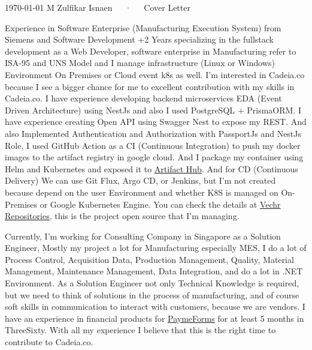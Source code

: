 \documentclass[10pt, a4paper]{awesome-cv}
\begin{document}
\makecvheader[R]

\makecvfooter
  {\today}
  {M Zulfikar Isnaen~~~·~~~Cover Letter}
  {}

\makelettertitle

\begin{cvletter}

Experience in Software Enterprise (Manufacturing Execution System) from Siemens and Software Development +2 Years specializing in the fullstack development as a Web Developer, software enterprise in Manufacturing refer to ISA-95 and UNS Model and I manage infrastructure (Linux or Windows) Environment On Premises or Cloud event k8s as well.
I'm interested in Cadeia.co because I see a bigger chance for me to excellent contribution with my skills in Cadeia.co. I have experience developing backend microservices EDA (Event Driven Architecture) using NestJs and also I used PostgreSQL + PrismaORM. I have experience creating Open API using Swagger Nest to expose my REST.
And also Implemented Authentication and Authorization with PassportJs and NestJs Role, I used GitHub Action as a CI (Continuous Integration) to push my docker images to the artifact registry in google cloud. And I package my container using Helm and Kubernetes and exposed it to \href{https://artifacthub.io/packages/helm/vechr/vechr-iiot}{Artifact Hub}.
And for CD (Continuous Delivery) We can use Git Flux, Argo CD, or Jenkins, but I'm not created because depend on the user Environment and whether K8S is managed on On-Premises or Google Kubernetes Engine. You can check the details at \href{https://github.com/orgs/vechr/repositories}{Vechr Repositories}, this is the project open source that I'm managing.

Currently, I'm working for Consulting Company in Singapore as a Solution Engineer, Mostly my project a lot for Manufacturing especially MES, I do a lot of Process Control, Acquisition Data, Production Management, Quality, Material Management, Maintenance Management, Data Integration, and do a lot in .NET Environment. As a Solution Engineer not only Technical Knowledge is required, 
but we need to think of solutions in the process of manufacturing, and of course soft skills in communication to interact with customers, because we are vendors. I have an experience in financial products for \href{https://paymeforms.com/}{PaymeForms}  for at least 5 months in ThreeSixty.
With all my experience I believe that this is the right time to contribute to Cadeia.co.


\end{cvletter}
\end{document}
